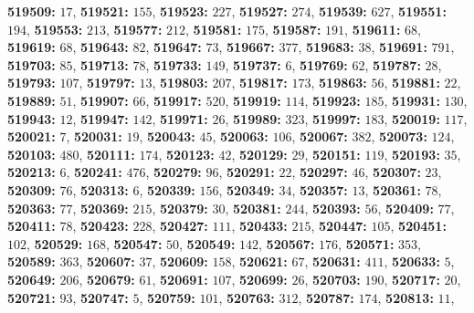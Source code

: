 \textsf{\bfseries 519509:} $17$, \textsf{\bfseries 519521:} $155$, \textsf{\bfseries 519523:} $227$, \textsf{\bfseries 519527:} $274$, \textsf{\bfseries 519539:} $627$, \textsf{\bfseries 519551:} $194$, \textsf{\bfseries 519553:} $213$, \textsf{\bfseries 519577:} $212$, \textsf{\bfseries 519581:} $175$, \textsf{\bfseries 519587:} $191$, \textsf{\bfseries 519611:} $68$, \textsf{\bfseries 519619:} $68$, \textsf{\bfseries 519643:} $82$, \textsf{\bfseries 519647:} $73$, \textsf{\bfseries 519667:} $377$, \textsf{\bfseries 519683:} $38$, \textsf{\bfseries 519691:} $791$, \textsf{\bfseries 519703:} $85$, \textsf{\bfseries 519713:} $78$, \textsf{\bfseries 519733:} $149$, \textsf{\bfseries 519737:} $6$, \textsf{\bfseries 519769:} $62$, \textsf{\bfseries 519787:} $28$, \textsf{\bfseries 519793:} $107$, \textsf{\bfseries 519797:} $13$, \textsf{\bfseries 519803:} $207$, \textsf{\bfseries 519817:} $173$, \textsf{\bfseries 519863:} $56$, \textsf{\bfseries 519881:} $22$, \textsf{\bfseries 519889:} $51$, \textsf{\bfseries 519907:} $66$, \textsf{\bfseries 519917:} $520$, \textsf{\bfseries 519919:} $114$, \textsf{\bfseries 519923:} $185$, \textsf{\bfseries 519931:} $130$, \textsf{\bfseries 519943:} $12$, \textsf{\bfseries 519947:} $142$, \textsf{\bfseries 519971:} $26$, \textsf{\bfseries 519989:} $323$, \textsf{\bfseries 519997:} $183$, \textsf{\bfseries 520019:} $117$, \textsf{\bfseries 520021:} $7$, \textsf{\bfseries 520031:} $19$, \textsf{\bfseries 520043:} $45$, \textsf{\bfseries 520063:} $106$, \textsf{\bfseries 520067:} $382$, \textsf{\bfseries 520073:} $124$, \textsf{\bfseries 520103:} $480$, \textsf{\bfseries 520111:} $174$, \textsf{\bfseries 520123:} $42$, \textsf{\bfseries 520129:} $29$, \textsf{\bfseries 520151:} $119$, \textsf{\bfseries 520193:} $35$, \textsf{\bfseries 520213:} $6$, \textsf{\bfseries 520241:} $476$, \textsf{\bfseries 520279:} $96$, \textsf{\bfseries 520291:} $22$, \textsf{\bfseries 520297:} $46$, \textsf{\bfseries 520307:} $23$, \textsf{\bfseries 520309:} $76$, \textsf{\bfseries 520313:} $6$, \textsf{\bfseries 520339:} $156$, \textsf{\bfseries 520349:} $34$, \textsf{\bfseries 520357:} $13$, \textsf{\bfseries 520361:} $78$, \textsf{\bfseries 520363:} $77$, \textsf{\bfseries 520369:} $215$, \textsf{\bfseries 520379:} $30$, \textsf{\bfseries 520381:} $244$, \textsf{\bfseries 520393:} $56$, \textsf{\bfseries 520409:} $77$, \textsf{\bfseries 520411:} $78$, \textsf{\bfseries 520423:} $228$, \textsf{\bfseries 520427:} $111$, \textsf{\bfseries 520433:} $215$, \textsf{\bfseries 520447:} $105$, \textsf{\bfseries 520451:} $102$, \textsf{\bfseries 520529:} $168$, \textsf{\bfseries 520547:} $50$, \textsf{\bfseries 520549:} $142$, \textsf{\bfseries 520567:} $176$, \textsf{\bfseries 520571:} $353$, \textsf{\bfseries 520589:} $363$, \textsf{\bfseries 520607:} $37$, \textsf{\bfseries 520609:} $158$, \textsf{\bfseries 520621:} $67$, \textsf{\bfseries 520631:} $411$, \textsf{\bfseries 520633:} $5$, \textsf{\bfseries 520649:} $206$, \textsf{\bfseries 520679:} $61$, \textsf{\bfseries 520691:} $107$, \textsf{\bfseries 520699:} $26$, \textsf{\bfseries 520703:} $190$, \textsf{\bfseries 520717:} $20$, \textsf{\bfseries 520721:} $93$, \textsf{\bfseries 520747:} $5$, \textsf{\bfseries 520759:} $101$, \textsf{\bfseries 520763:} $312$, \textsf{\bfseries 520787:} $174$, \textsf{\bfseries 520813:} $11$, 
